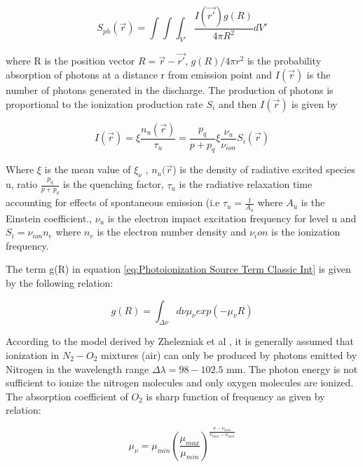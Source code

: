 \documentclass[paper=a4, fontsize=13pt]{scrartcl}
\begin{document}
\begin{equation} \label{eq:Photoionization Source Term Classic Int}
S_{ph}(\vec{r}) = {\int\int\int_{V'}} \frac{I(\vec{r'}) g(R)}{4 \pi {R^2}} d{V'}
\end{equation} 

where R is the position vector $R= \vec{r}-\vec{r'}$, $g(R)/4 \pi r^2$ is the probability absorption of photons at a distance r from emission point and $I(\vec{r})$ is the number of photons generated in the discharge. The production of photons is proportional to the ionization production rate $S_i$ and then $I(\vec{r})$ is given by 

\begin{equation}
I(\vec{r}) = \xi \frac{n_u(\vec{r})}{\tau_u}= \frac{p_q}{p+p_q} \xi \frac{\nu_u}{\nu_{ion}} S_i(\vec{r})
\end{equation} 

Where $\xi$ is the mean value of $\xi_\nu$ , $n_u(\vec{r}$) is the density of radiative excited species u, ratio $\frac{p_q}{p+p_q}$ is the quenching factor, $\tau_u$ is the radiative relaxation time accounting for effects of spontaneous emission (i.e $\tau_u = \frac{1}{A_u}$ where $A_u$ is the Einstein coefficient., $\nu_u$ is the electron impact excitation frequency for level u and $S_i=\nu_{ion} n_e$ where $n_e$ is the electron number density and $\nu_ion$ is the ionization frequency. 

The term g(R) in equation \ref{eq:Photoionization Source Term Classic Int} is given by the following relation:

\begin{equation} \label{eq:gR term Classic Int}
g(R) = \int_{\Delta \nu} d\nu \mu_\nu exp(-\mu_\nu R)
\end{equation} 

According to the model derived by Zhelezniak et al \cite{ZhelezniakM.B.andMnatsakanianA.K.andSizykh1982PhotoionizationDischarge}, it is generally assumed that ionization in $N_2-O_2$ mixtures (air) can only be produced by photons emitted by Nitrogen in the wavelength range $\Delta \lambda = 98-102.5$ mm. The photon energy is not sufficient to ionize the nitrogen molecules and only oxygen molecules are ionized. The absorption coefficient of $O_2$ is sharp function of frequency as given by relation:

\begin{equation}\label{eq:Absorption coefficient O2 Classic Int}
\mu_\nu = \mu_{min} ( \frac{\mu_{max}}{\mu_{min}} ) ^ {\frac{\nu-\nu_{min}}{\nu_{max}-\nu_{min}}}
\end{equation} 
\end{document}

